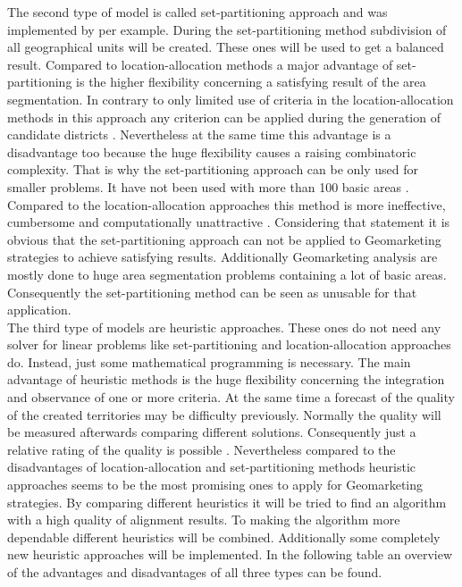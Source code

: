The second type of model is called set-partitioning approach and was implemented by \citeauthor{mehrotra}\cite{mehrotra} per example. During the set-partitioning method subdivision of all geographical units will be created. These ones will be used to get a balanced result. Compared to location-allocation methods a major advantage of set-partitioning is the higher flexibility concerning a satisfying result of the area segmentation. In contrary to only limited use of criteria in the location-allocation methods in this approach any criterion can be applied during the generation of candidate districts \cite{kalcsics}. Nevertheless at the same time this advantage is a disadvantage too because the huge flexibility causes a raising combinatoric complexity. That is why the set-partitioning approach can be only used for smaller problems. It have not been used with more than 100 basic areas \cite{kalcsics}. Compared to the location-allocation approaches this method is more ineffective, cumbersome and computationally unattractive \cite{zoltner}. Considering that statement it is obvious that the set-partitioning approach can not be applied to Geomarketing strategies to achieve satisfying results. Additionally Geomarketing analysis are mostly done to huge area segmentation problems containing a lot of basic areas. Consequently the set-partitioning method can be seen as unusable for that application. \\
The third type of models are heuristic approaches. These ones do not need any solver for linear problems like set-partitioning and location-allocation approaches do. Instead, just some mathematical programming is necessary. The main advantage of heuristic methods is the huge flexibility concerning the integration and observance of one or more criteria. At the same time a forecast of the quality of the created territories may be difficulty previously. Normally the quality will be measured afterwards comparing different solutions. Consequently just a relative rating of the quality is possible \cite{schroeder}. Nevertheless compared to the disadvantages of location-allocation and set-partitioning methods heuristic approaches seems to be the most promising ones to apply for Geomarketing strategies. By comparing different heuristics it will be tried to find an algorithm with a high quality of alignment results. To making the algorithm more dependable different heuristics will be combined. Additionally some completely new heuristic approaches will be implemented. In the following table an overview of the advantages and disadvantages of all three types can be found.

